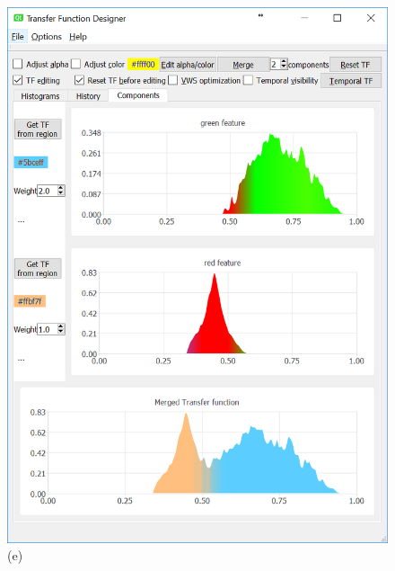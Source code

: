 \documentclass[twoside,twocolumn,10pt]{article}
\begin{document}
\begin{figure}
\begin{minipage}{.16\textwidth}
		\includegraphics[width=1\linewidth]{tf_vortex_merged_segment_blend_green_red}
		(e)
	\end{minipage}~
	\begin{minipage}{.16\textwidth}
		\centering

\end{minipage}
\end{figure}
\end{document}
